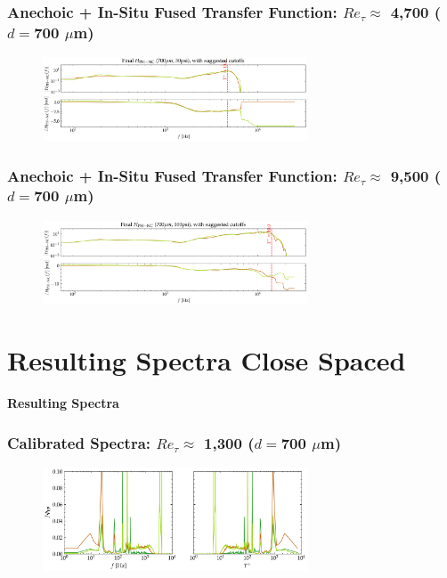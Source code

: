 \documentclass[aspectratio=169,9pt]{beamer}
\begin{document}
\begin{frame}
  \frametitle{Anechoic + In-Situ Fused Transfer Function: $Re_\tau \approx$ 4,700 ($d=$700 $\mu$m)}
  \begin{figure}
    \centering
    \includegraphics[width=0.7\textwidth]{tf_calib/700_50psi_H_fuse_situ.png}
  \end{figure}
\end{frame}

\begin{frame}
  \frametitle{Anechoic + In-Situ Fused Transfer Function: $Re_\tau \approx$ 9,500 ($d=$700 $\mu$m)}
  \begin{figure}
    \centering
    \includegraphics[width=0.7\textwidth]{tf_calib/700_100psi_H_fuse_situ.png}
  \end{figure}
\end{frame}

\section{Resulting Spectra Close Spaced}

\begin{frame}
  \centering
  \vfill
  {\Huge\bfseries \textcolor{cardinalred}{Resulting Spectra}}
  \vfill
\end{frame}

\begin{frame}
  \frametitle{Calibrated Spectra: $Re_\tau \approx$ 1,300 ($d=$700 $\mu$m)}
  \begin{figure}
    \centering
    \includegraphics[width=0.7\textwidth]{tf_corrected_spectra/700_0psi_tf_fused_insitu_spec_close.png}
  \end{figure}
\end{frame}
\end{document}
